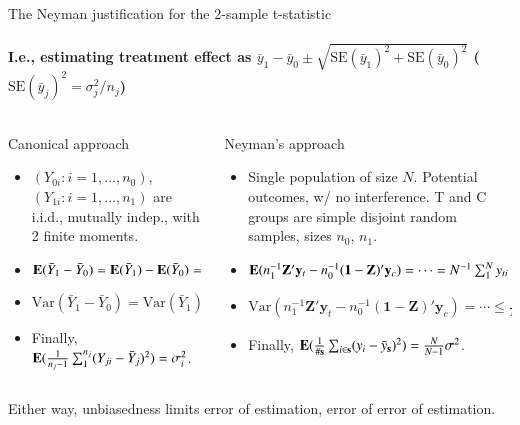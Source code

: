 \begin{frame}{The Neyman justification for the 2-sample t-statistic} \pause
 \framesubtitle{I.e., estimating treatment effect as %
$\bar{y}_{1} - \bar{y}_0   \pm \sqrt{\mathrm{SE}(\bar{y}_{1})^{2} +
  \mathrm{SE}(\bar{y}_{0}) ^{2}}$ ($\mathrm{SE}(\bar{y}_{j})^{2} = \sigma_{j}^{2}/n_{j} $) }
\pause

\begin{columns}
  \begin{Column}
    { Canonical approach}  
    \begin{itemize}[<+->]
    \item $(Y_{0i}: i=1, \ldots, n_{0})  $, $(Y_{1i}: i=1, \ldots, n_{1})  $ are
i.i.d., mutually indep., with 2 finite moments. 
    \item $\mathbf{E}(\bar{Y}_{1} - \bar{Y}_{0}) =
      \mathbf{E}(\bar{Y}_{1}) - \mathbf{E}(\bar{Y}_{0}) = \mu_{1} - \mu_{0}$
    \item $\mathrm{Var}(\bar{Y}_{1} - \bar{Y}_{0}) =
      \mathrm{Var}(\bar{Y}_{1}) + \mathrm{Var}(\bar{Y}_{0}) =
      \sigma_{1}/n_{1} + \sigma_{0}/n_{0}$
    \item Finally, $\mathbf{E}(\frac{1}{n_{j}-1} \sum_{1}^{n_{j}}
      (Y_{ji} - \bar{Y}_{j} )^{2}) = \sigma^{2}_{i}$.
    \end{itemize}
 \end{Column}
  \begin{Column}
    { Neyman's approach}  
    \begin{itemize}[<+->]
    \item Single population of size $N$. Potential outcomes, w/ no
  interference.  T and C groups are simple
   disjoint random samples, sizes $n_{0}$, $n_{1}$.
 \item $\mathbf{E}(n_{1}^{-1}\mathbf{Z}'\mathbf{y}_{t} - n_{0}^{-1}(\mathbf{1}-
   \mathbf{Z})'\mathbf{y}_{c} ) = \cdots = N^{-1}\sum_{1}^{N} y_{ti} -
   N^{-1}\sum_{1}^{N} y_{ci}$
   \item $\mathrm{Var}(n_{1}^{-1}\mathbf{Z}'\mathbf{y}_{t} - n_{0}^{-1}(\mathbf{1}-
   \mathbf{Z})'\mathbf{y}_{c} ) = \cdots \leq \frac{N}{N-1}
   \left(\frac{\sigma_{1}^{2}}{n_{1}}  +
     \frac{\sigma_{0}^{2}}{n_{0}}\right)$     
\item Finally, $\mathbf{E}(\frac{1}{\# \mathbf{s}} \sum_{i \in \mathbf{s}}
      (y_{i} - \bar{y}_{\mathbf{s}} )^{2}) = \frac{N}{N-1}\sigma^{2}$.

    \end{itemize}
 \end{Column}
\end{columns}
\pause
Either way, unbiasedness limits error of estimation, error of error of estimation. 
\end{frame}

